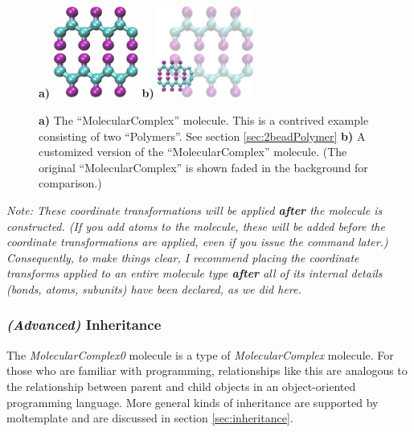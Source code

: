 \documentclass[11pt]{article}
\begin{document}
\begin{figure}[htbp]
\centering
\textbf{a)}
\includegraphics[height=3cm]{mol_complex_LR.jpg}
\hspace{1cm}
\textbf{b)}
\includegraphics[height=3cm]{mol_complex+mol_complex0_transparent_LR.jpg}
\caption{
\label{fig:mol_complex}
\textbf{a)}
The ``MolecularComplex'' molecule.  This is a contrived example consisting of
two ``Polymers''.  See section \ref{sec:2beadPolymer}
\textbf{b)}
A customized version of the ``MolecularComplex'' molecule.  
(The original ``MolecularComplex'' is shown faded in the background for comparison.)
}
\end{figure}


\textit{Note: These coordinate transformations will be 
applied \textbf{after} the molecule is constructed.
(If you add atoms to the molecule, these will be added before
the coordinate transformations are applied,
even if you issue the command later.)
Consequently, to make things clear, 
I recommend placing the coordinate transforms applied to 
an entire molecule type \textbf{after} all of its internal details 
(bonds, atoms, subunits) have been declared, as we did here.}

\subsubsection*{\textit{(Advanced)} Inheritance}
\label{sec:inheritance_intro}
The \textit{MolecularComplex0} molecule is a type of \textit{MolecularComplex} molecule.
For those who are familiar with programming, 
relationships like this are analogous to the relationship 
between parent and child objects in an object-oriented programming language.
More general kinds of inheritance are supported by moltemplate
and are discussed in section \ref{sec:inheritance}.
\end{document}
